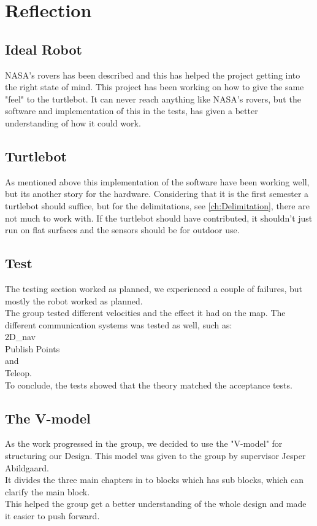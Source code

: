 \chapter{Reflection}

\section{Ideal Robot}

NASA's rovers has been described and this has helped the project getting into the right state of mind. This project has been working on how to give the same "feel" to the turtlebot. It can never reach anything like NASA's rovers, but the software and implementation of this in the tests, has given a better understanding of how it could work.\\

\section{Turtlebot}

As mentioned above this implementation of the software have been working well, but its another story for the hardware. Considering that it is the first semester a turtlebot should suffice, but for the delimitations, see \ref{ch:Delimitation}, there are not much to work with. If the turtlebot should have contributed, it shouldn't just run on flat surfaces and the sensors should be for outdoor use.\\ 

\section{Test}

The testing section worked as planned, we experienced a couple of failures, but mostly the robot worked as planned.\\
The group tested different velocities and the effect it had on the map. The different communication systems was tested as well, such as:\\
2D\_nav\\
Publish Points\\
and\\
Teleop.\\
To conclude, the tests showed that the theory matched the acceptance tests.\\

\section{The V-model}

As the work progressed in the group, we decided to use the "V-model" for structuring our Design. This model was given to the group by supervisor Jesper Abildgaard.\\
It divides the three main chapters in to blocks which has sub blocks, which can clarify the main block.\\
This helped the group get a better understanding of the whole design and made it easier to push forward.\\


